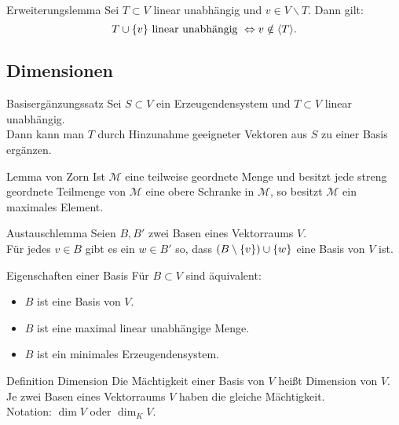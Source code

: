 \documentclass[main.tex]{subfiles}
\begin{document}
\begin{karte}{Erweiterungslemma}
    Sei \(T \subset V\) linear unabhängig und \(v \in V \backslash T \). Dann gilt: 
    \[T \cup \{v\} \text{ linear unabhängig } 
    \Leftrightarrow v \notin \langle T \rangle. \]
\end{karte}
\subsection*{Dimensionen}
\begin{karte}{Basisergänzungssatz}
    Sei \(S \subset V\) ein Erzeugendensystem und \(T \subset V\)
    linear unabhängig. \\
    Dann kann man \(T\) durch Hinzunahme geeigneter Vektoren aus \(S\)
    zu einer Basis ergänzen.
\end{karte}
\begin{karte}{Lemma von Zorn}
    Ist \(\mathcal{M}\) eine teilweise geordnete Menge und besitzt
    jede streng geordnete Teilmenge von \(\mathcal{M}\) eine obere 
    Schranke in \(\mathcal{M}\), so besitzt \(\mathcal{M}\) 
    ein maximales Element.
\end{karte}
\begin{karte}{Austauschlemma}
    Seien \(B, B'\) zwei Basen eines Vektorraums \(V\). \\ 
    Für jedes \(v \in B \) gibt es ein \(w \in B'\) so, 
    dass \((B \setminus \{v\}) \cup \{w\}\) 
    eine Basis von \(V\) ist.
\end{karte}
\begin{karte}{Eigenschaften einer Basis}
    Für \( B \subset V \) sind äquivalent: 
    \begin{itemize}
        \item \(B\) ist eine Basis von \(V\).
        \item \(B\) ist eine maximal linear unabhängige Menge.
        \item \(B\) ist ein minimales Erzeugendensystem.
    \end{itemize}
\end{karte}
\begin{karte}{Definition Dimension}
    Die Mächtigkeit einer Basis von \(V\) heißt Dimension von \(V\). \\ 
    Je zwei Basen eines Vektorraums \(V\) haben die gleiche Mächtigkeit. \\
    Notation: \( \dim V \) oder \( \dim_K V \).
\end{karte}
\end{document}
